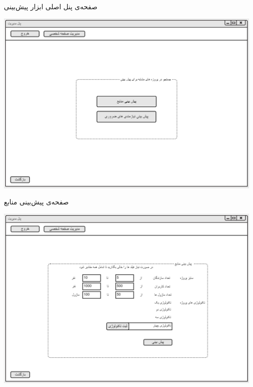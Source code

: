 \documentclass{article}
\begin{document}
\vspace{1cm}
صفحه‌ی پنل اصلی ابزار پیش‌بینی
\begin{center}
\includegraphics[width=\textwidth]{Prototype/Predict/PredictHomePage.png}
\end{center}

\newpage
\vspace{1cm}
صفحه‌ی پیش‌بینی منابع
\begin{center}
\includegraphics[width=\textwidth]{Prototype/Predict/ResourcePrediction.png}
\end{center}
\end{document}
